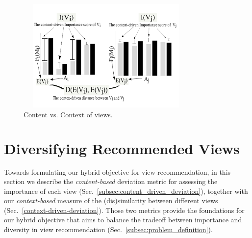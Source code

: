 
\begin{figure}
	\includegraphics[width=3.5in,height=2.2in]{figures/introduction/pre2}
\vspace{-18pt}
	\caption[content vs context]{Content vs. Context of views.}
	\label{fig:content-contex}
\vspace{-12pt}
\end{figure}

\section{Diversifying Recommended Views}
\label{sec:diversifying_recommended_visualizations}


Towards formulating our hybrid objective for view recommendation, in this section we describe the {\em content-based} deviation metric for assessing the importance of each view (Sec.~\ref{subsec:content_driven_deviation}), together with our {\em context-based} measure of the (dis)similarity between different views (Sec.~\ref{context-driven-deviation}). 
%
Those two metrics provide the foundations for our hybrid objective that aims to balance the tradeoff between importance and diversity in view recommendation (Sec.~\ref{subsec:problem_definition}).  
\vspace{-8pt}


